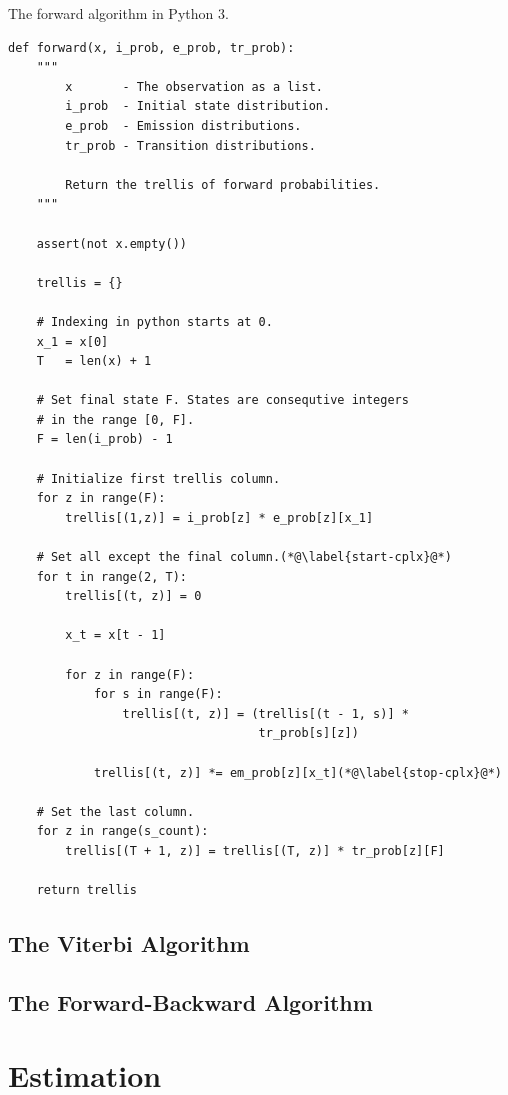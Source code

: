 \begin{algorithm}[!p]
\caption{The forward algorithm in Python 3.}\label{forward-algorithm}
\begin{lstlisting}
def forward(x, i_prob, e_prob, tr_prob): 
    """
        x       - The observation as a list.
        i_prob  - Initial state distribution.
        e_prob  - Emission distributions.
        tr_prob - Transition distributions.

        Return the trellis of forward probabilities. 
    """

    assert(not x.empty()) 

    trellis = {}

    # Indexing in python starts at 0.
    x_1 = x[0]
    T   = len(x) + 1

    # Set final state F. States are consequtive integers 
    # in the range [0, F]. 
    F = len(i_prob) - 1 

    # Initialize first trellis column.
    for z in range(F):
        trellis[(1,z)] = i_prob[z] * e_prob[z][x_1]

    # Set all except the final column.(*@\label{start-cplx}@*)
    for t in range(2, T):
        trellis[(t, z)] = 0

        x_t = x[t - 1]

        for z in range(F):
            for s in range(F):
                trellis[(t, z)] = (trellis[(t - 1, s)] * 
                                   tr_prob[s][z])

            trellis[(t, z)] *= em_prob[z][x_t](*@\label{stop-cplx}@*)

    # Set the last column.
    for z in range(s_count):
        trellis[(T + 1, z)] = trellis[(T, z)] * tr_prob[z][F]

    return trellis
\end{lstlisting}
\end{algorithm}


\subsection{The Viterbi Algorithm}
\label{hmm-viterbi}

\subsection{The Forward-Backward Algorithm}
\label{hmm-fw-bw}

\section{Estimation}

